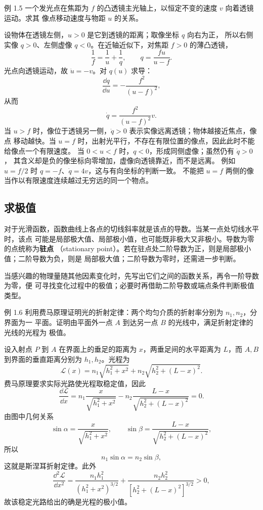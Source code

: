 \begin{origexamplebox}{例 1.5}
一个发光点在焦距为 $f$ 的凸透镜主光轴上，以恒定不变的速度 $v$ 向着透镜运动。求其
像点移动速度与物距 $u$ 的关系。
\end{origexamplebox}

\begin{xesolution}
设物体在透镜左侧，$u>0$ 是它到透镜的距离；取像坐标 $q$ 向右为正，
所以右侧实像 $q>0$、左侧虚像 $q<0$。在近轴近似下，对焦距 $f>0$ 的薄凸透镜，
\[
 \frac1f=\frac1u+\frac1q,\qquad q=\frac{fu}{u-f}.
\]
光点向透镜运动，故 $\dot u=-v$。对 $q(u)$ 求导：
\[
 \frac{\dd q}{\dd u}=-\frac{f^2}{(u-f)^2},
\]
从而
\[
 \boxed{\dot q=\frac{f^2}{(u-f)^2}v}.
\]
当 $u>f$ 时，像位于透镜另一侧，$\dot q>0$ 表示实像远离透镜；物体越接近焦点，像点
移动越快。当 $u=f$ 时，出射光平行，不存在有限位置的像点，因此此时不能给像点一个有限速度。
当 $0<u<f$ 时，$q<0$，形成同侧虚像；虽然仍有 $\dot q>0$，
其含义却是负的像坐标向零增加，虚像向透镜靠近，而不是远离。
例如 $u=f/2$ 时 $q=-f$、$\dot q=4v$，这与有向坐标的判断一致。
不能把 $u=f$ 两侧的像当作以有限速度连续越过无穷远的同一个物点。
\end{xesolution}

\subsection{求极值}

对于光滑函数，函数曲线上各点的切线斜率就是该点的导数。当某一点处切线水平时，该点
可能是局部极大值、局部极小值，也可能既非极大又非极小。导数为零的点统称为\textbf{驻点}
（stationary point）。若在驻点处二阶导数为正，则是局部极小值；二阶导数为负，则是
局部极大值；二阶导数为零时，还需进一步判断。

\extremaDiagram

当感兴趣的物理量随其他因素变化时，先写出它们之间的函数关系，再令一阶导数为零，便
可寻找变化过程中的极值；必要时再借助二阶导数或端点条件判断极值类型。

\Needspace{0.38\textheight}
\begin{origexamplebox}{例 1.6}
利用费马原理证明光的折射定律：两个均匀介质的折射率分别为 $n_1,n_2$，分界面为一
平面。证明由平面外一点 $A$ 到达另一点 $B$ 的光线中，满足折射定律的光线的光程为
极值。
\probdiagOneSix
\end{origexamplebox}

\begin{xesolution}
设入射点 $P$ 到 $A$ 在界面上的垂足的距离为 $x$，两垂足间的水平距离为 $L$，而 $A,B$
到界面的垂直距离分别为 $h_1,h_2$。光程为
\[
 \mathcal L(x)=n_1\sqrt{h_1^2+x^2}
 +n_2\sqrt{h_2^2+(L-x)^2}.
\]
费马原理要求实际光路使光程取稳定值，因此
\[
 \frac{\dd\mathcal L}{\dd x}
 =n_1\frac{x}{\sqrt{h_1^2+x^2}}
 -n_2\frac{L-x}{\sqrt{h_2^2+(L-x)^2}}=0.
\]
由图中几何关系
\[
 \sin\alpha=\frac{x}{\sqrt{h_1^2+x^2}},\qquad
 \sin\beta=\frac{L-x}{\sqrt{h_2^2+(L-x)^2}},
\]
所以
\[
 \boxed{n_1\sin\alpha=n_2\sin\beta},
\]
这就是斯涅耳折射定律。此外
\[
 \frac{\dd^2\mathcal L}{\dd x^2}
 =\frac{n_1h_1^2}{(h_1^2+x^2)^{3/2}}
 +\frac{n_2h_2^2}{[h_2^2+(L-x)^2]^{3/2}}>0,
\]
故该稳定光路给出的确是光程的极小值。
\end{xesolution}

